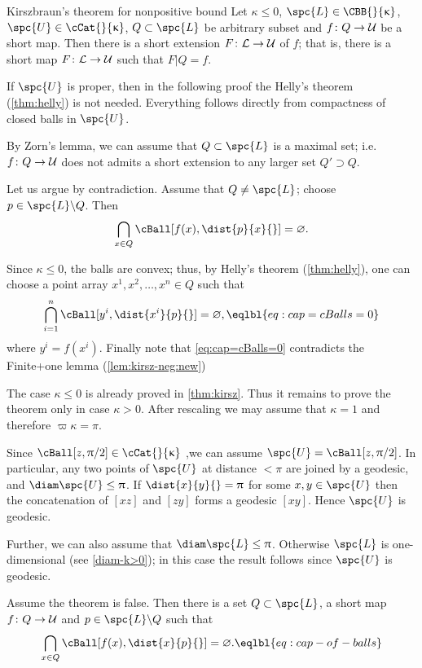 \begin{thm}{Kirszbraun's theorem for nonpositive bound}
\label{thm:kirsz}
Let
$\kappa\le0$,
$\spc{L}\in\CBB{}{\kappa}$, 
$\spc{U}\in\cCat{}{\kappa}$, 
$Q\subset \spc{L}$ be arbitrary subset
and $f\: Q\to\spc{U}$ be a short map.
Then there is a short extension 
$F\:\spc{L}\to \spc{U}$ of $f$;
that is, there is a short map $F\:\spc{L}\to \spc{U}$ such that $F|Q=f$.
\end{thm}

If $\spc{U}$ is proper, then in the following proof the Helly's theorem (\ref{thm:helly}) is not needed.
Everything follows directly from compactness of closed balls in $\spc{U}$.


By Zorn's lemma, we can assume 
that $Q\subset\spc{L}$ is a maximal set;
i.e. $f\:Q\to\spc{U}$ does not admits a short extension to any larger set $Q'\supset Q$.

Let us argue by contradiction.
Assume that $Q\not=\spc{L}$;
choose $p\in \spc{L}\backslash Q$.
Then
\[\bigcap_{x\in Q} \cBall[f(x),\dist{p}{x}{}]
=
\emptyset.\]

Since $\kappa\le 0$, the balls are convex; 
thus, by Helly's theorem (\ref{thm:helly}), 
one can choose a point array $x^1,x^2,\dots, x^n\in Q$ such that
\[\bigcap_{i=1}^n \cBall[y^i,\dist{x^i}{p}{}]
=
\emptyset,
\eqlbl{eq:cap=cBalls=0}\]
where $y^i=f(x^i)$.
Finally note that \ref{eq:cap=cBalls=0} contradicts the Finite+one lemma (\ref{lem:kirsz-neg:new})\qeds




The case $\kappa\le 0$ is already proved in \ref{thm:kirsz}.
Thus it remains to prove the theorem only in case $\kappa>0$.
After rescaling we may assume that $\kappa=1$
and therefore $\varpi\kappa=\pi$.

Since $\cBall[z,\pi/2]\in\cCat{}{\kappa}$ %
,we can assume $\spc{U}=\cBall[z,\pi/2]$. 
In particular, any  two points of $\spc{U}$  at distance $<\pi$ are  joined by a geodesic, and $\diam\spc{U}\le\pi$.
If $\dist{x}{y}{}=\pi$ for some $x,y\in\spc{U}$ then the concatenation  of 
$[x z]$ and $[z y]$ forms a geodesic $[x y]$.
Hence $\spc{U}$ is geodesic.

Further, we can also assume that $\diam\spc{L}\le\pi$.
Otherwise $\spc{L}$ is one-dimensional (see \ref{diam-k>0});
in this case the result follows since $\spc{U}$ is geodesic.

\medskip

Assume the theorem is false. Then 
there is a set $Q\subset \spc{L}$, 
a short map $f\: Q\to \spc{U}$ and  
$p\in \spc{L}\backslash  Q$ such that 
\[\bigcap_{x\in  Q}
\cBall[f(x),\dist{x}{p}{}]=\emptyset.
\eqlbl{eq:cap-of-balls}\]

